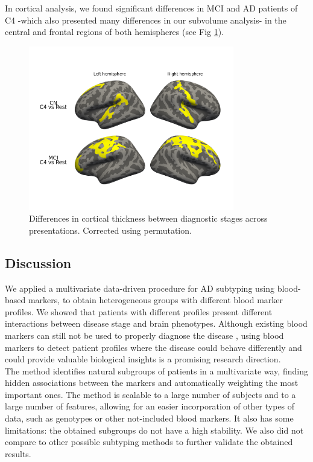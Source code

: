 In cortical analysis, we found significant differences in MCI and AD patients of C4 -which also presented many differences in our subvolume analysis- in the central and frontal regions of both hemispheres (see Fig \ref{dxcluster_againstrest_cort}).

\begin{figure}[!htbp]
\centering
\includegraphics[width=0.8\textwidth]{figures/cimlr/ex4_cort.png}
\caption[Diagnostic interaction analysis, cortical thickness.]{Differences in cortical thickness between diagnostic stages across presentations. Corrected using permutation.}
\label{dxcluster_againstrest_cort}
\end{figure}

\subsection{Discussion}
\label{conclusions}

We applied a multivariate data-driven procedure for AD subtyping using blood-based markers, to obtain heterogeneous groups with different blood marker profiles. We showed that patients with different profiles present different interactions between disease stage and brain phenotypes. Although existing blood markers can still not be used to properly diagnose the disease \cite{Schneider2009,Gupta2016,Lovheim2017}, using blood markers to detect patient profiles where the disease could behave differently and could provide valuable biological insights is a promising research direction. \\

The method identifies natural subgroups of patients in a multivariate way, finding hidden associations between the markers and automatically weighting the most important ones. The method is scalable to a large number of subjects and to a large number of features, allowing for an easier incorporation of other types of data, such as genotypes or other not-included blood markers. It also has some limitations: the obtained subgroups do not have a high stability. We also did not compare to other possible subtyping methods to further validate the obtained results. \\

